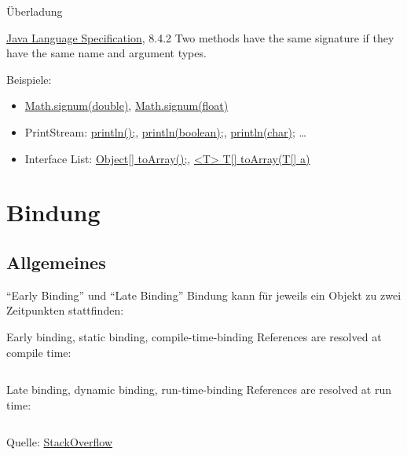 \documentclass[usepdftitle=false,hyperref={pdfpagelabels=false}]{beamer}
\begin{document}
\begin{frame}{Überladung}
    \begin{block}{\href{http://docs.oracle.com/javase/specs/jls/se7/jls7.pdf}{Java Language Specification}, 8.4.2}
        Two methods have the same signature if they have the same name and argument types.
    \end{block}

    Beispiele:
    \begin{itemize}
        \item \href{http://docs.oracle.com/javase/7/docs/api/java/lang/Math.html\#signum(double)}{Math.signum(double)},
              \href{http://docs.oracle.com/javase/7/docs/api/java/lang/Math.html\#signum(float)}{Math.signum(float)}
        \item PrintStream:
              \href{http://docs.oracle.com/javase/7/docs/api/java/io/PrintStream.html\#println()}{println();},
              \href{http://docs.oracle.com/javase/7/docs/api/java/io/PrintStream.html\#println(boolean)}{println(boolean);},
              \href{http://docs.oracle.com/javase/7/docs/api/java/io/PrintStream.html\#println(char)}{println(char);} \dots
        \item Interface List:
              \href{http://docs.oracle.com/javase/7/docs/api/java/util/List.html\#toArray()}{Object[] toArray();},
              \href{http://docs.oracle.com/javase/7/docs/api/java/util/List.html\#toArray(T[])}{<T> T[] toArray(T[] a)}
    \end{itemize}
\end{frame}

\section{Bindung}
\subsection{Allgemeines}

\begin{frame}{"`Early Binding"' und "`Late Binding"'}
    Bindung kann für jeweils ein Objekt zu zwei Zeitpunkten stattfinden:
    \begin{block}{Early binding, static binding, compile-time-binding}
        References are resolved at compile time:
        \inputminted[linenos=false, numbersep=5pt, tabsize=4, fontsize=\small, firstline=5, lastline=7]{java}{singleLines.java}
    \end{block}

    \begin{block}{Late binding, dynamic binding, run-time-binding}
        References are resolved at run time:
        \inputminted[linenos=false, numbersep=5pt, tabsize=4, fontsize=\small, firstline=9, lastline=13]{java}{singleLines.java}
    \end{block}
    {\tiny Quelle: \href{http://stackoverflow.com/a/640990/562769}{StackOverflow}}
\end{frame}
\end{document}
